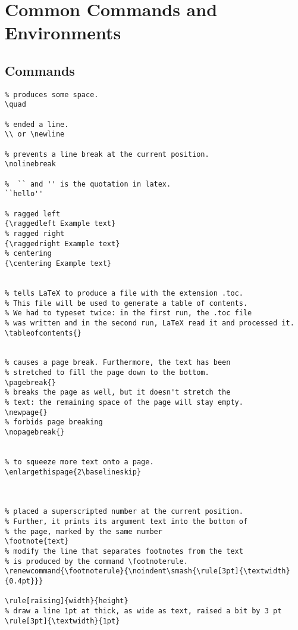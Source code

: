 
\chapter[Commands and Environments]{Common Commands and Environments}

\section{Commands}
\label{sec:commands}


\lstset{language=TeX}
\begin{lstlisting}
% produces some space.
\quad                           

% ended a line.
\\ or \newline                  

% prevents a line break at the current position.
\nolinebreak                    

%  `` and '' is the quotation in latex. 
``hello''                       

% ragged left  
{\raggedleft Example text}      
% ragged right
{\raggedright Example text}     
% centering 
{\centering Example text}        


% tells LaTeX to produce a file with the extension .toc. 
% This file will be used to generate a table of contents. 
% We had to typeset twice: in the first run, the .toc file
% was written and in the second run, LaTeX read it and processed it.
\tableofcontents{}              


% causes a page break. Furthermore, the text has been 
% stretched to fill the page down to the bottom.
\pagebreak{}
% breaks the page as well, but it doesn't stretch the
% text: the remaining space of the page will stay empty.
\newpage{}
% forbids page breaking
\nopagebreak{}


% to squeeze more text onto a page. 
\enlargethispage{2\baselineskip}



% placed a superscripted number at the current position.
% Further, it prints its argument text into the bottom of 
% the page, marked by the same number
\footnote{text}
% modify the line that separates footnotes from the text 
% is produced by the command \footnoterule.
\renewcommand{\footnoterule}{\noindent\smash{\rule[3pt]{\textwidth}{0.4pt}}}

\rule[raising]{width}{height}
% draw a line 1pt at thick, as wide as text, raised a bit by 3 pt
\rule[3pt]{\textwidth}{1pt}


\end{lstlisting}
